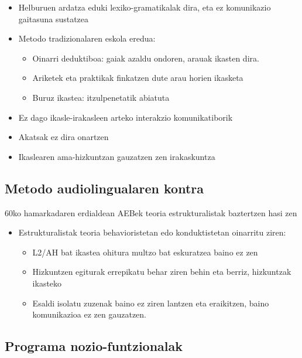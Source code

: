 \documentclass[
]{book}
\providecommand{\tightlist}{%
  \setlength{\itemsep}{0pt}\setlength{\parskip}{0pt}}
\begin{document}
\begin{itemize}
\tightlist
\item
  Helburuen ardatza eduki lexiko-gramatikalak dira, eta ez komunikazio gaitasuna sustatzea
\item
  Metodo tradizionalaren eskola eredua:

  \begin{itemize}
  \tightlist
  \item
    Oinarri deduktiboa: gaiak azaldu ondoren, arauak ikasten dira.
  \item
    Ariketek eta praktikak finkatzen dute arau horien ikasketa
  \item
    Buruz ikastea: itzulpenetatik abiatuta
  \end{itemize}
\item
  Ez dago ikasle-irakasleen arteko interakzio komunikatiborik
\item
  Akatsak ez dira onartzen
\item
  Ikaslearen ama-hizkuntzan gauzatzen zen irakaskuntza
\end{itemize}

\hypertarget{metodo-audiolingualaren-kontra}{%
\subsection{Metodo audiolingualaren kontra}\label{metodo-audiolingualaren-kontra}}

60ko hamarkadaren erdialdean AEBek teoria estrukturalistak baztertzen hasi zen

\begin{itemize}
\tightlist
\item
  Estrukturalistak teoria behavioristetan edo konduktistetan oinarritu ziren:

  \begin{itemize}
  \tightlist
  \item
    L2/AH bat ikastea ohitura multzo bat eskuratzea baino ez zen
  \item
    Hizkuntzen egiturak errepikatu behar ziren behin eta berriz, hizkuntzak ikasteko
  \item
    Esaldi isolatu zuzenak baino ez ziren lantzen eta eraikitzen, baino komunikazioa ez zen gauzatzen.
  \end{itemize}
\end{itemize}

\hypertarget{programa-nozio-funtzionalak}{%
\subsection{Programa nozio-funtzionalak}\label{programa-nozio-funtzionalak}}
\end{document}
